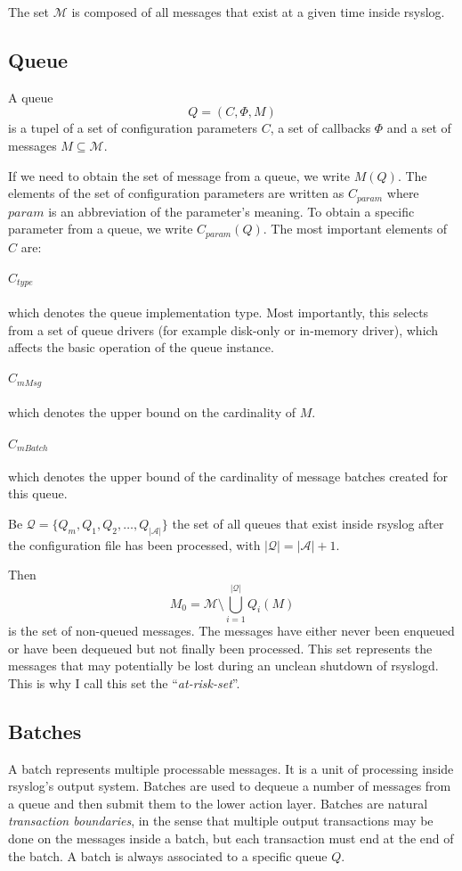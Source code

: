 \documentclass[a4paper,10pt]{article}
\newcommand{\MM}{\mathcal{M}}
\newcommand{\QQ}{\mathcal{Q}}
\newcommand{\AAA}{\mathcal{A}}
\begin{document}
The set $\MM$ is composed of all messages that exist at a given time inside rsyslog.

\subsection{Queue}
A queue
$$Q = (C, \Phi, M)$$
is a tupel of a set of configuration parameters $C$, a set of callbacks $\Phi$ and a set of messages $M \subseteq \MM$.

If we need to obtain the set of message from a queue, we write $M(Q)$. The elements of the set of configuration parameters are written as $C_{param}$ where $param$ is an abbreviation of the parameter's meaning. To obtain a specific parameter from a queue, we write $C_{param}(Q)$. The most important elements of $C$ are:

\paragraph{$C_{type}$} which denotes the queue implementation type. Most importantly, this selects from a set of queue drivers (for example disk-only or in-memory driver), which affects the basic operation of the queue instance.

\paragraph{$C_{mMsg}$} which denotes the upper bound on the cardinality of $M$.

\paragraph{$C_{mBatch}$} which denotes the upper bound of the cardinality of message batches created for this queue.

Be $\QQ = \{Q_m, Q_1, Q_2, \ldots, Q_{|\AAA|}\}$ the set of all queues that exist inside rsyslog after the configuration file has been processed, with $|\QQ| = |\AAA| + 1$.

Then
$$M_0 = \MM \setminus \bigcup_{i=1}^{|\QQ|} Q_i(M)$$
is the set of non-queued messages. The messages have either never been enqueued or have been dequeued but not finally been processed. This set represents the messages that may potentially be lost during an unclean shutdown of rsyslogd. This is why I call this set the ``\emph{at-risk-set}''.


\subsection{Batches}
A batch represents multiple processable messages. It is a unit of processing inside rsyslog's output system. Batches are used to dequeue a number of messages from a queue and then submit them to the lower action layer. Batches are natural \emph{transaction boundaries}, in the sense that multiple output transactions may be done on the messages inside a batch, but each transaction must end at the end of the batch. A batch is always associated to a specific queue $Q$.
\end{document}
